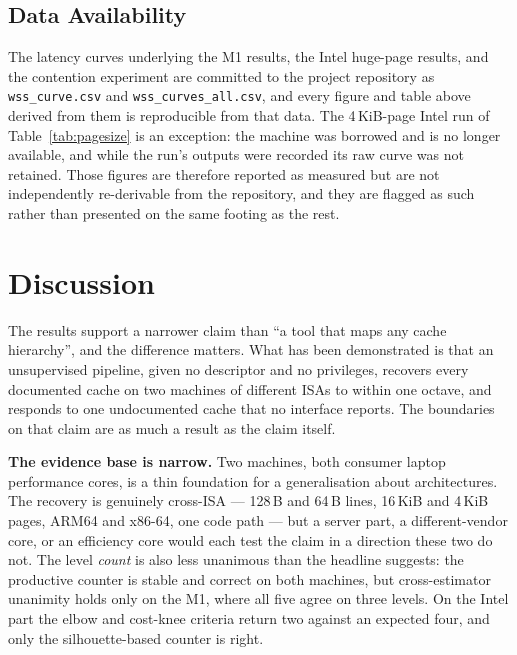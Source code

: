 \documentclass[conference]{IEEEtran}
\begin{document}
\subsection{Data Availability}

The latency curves underlying the M1 results, the Intel huge-page results, and
the contention experiment are committed to the project repository as
\texttt{wss\_curve.csv} and \texttt{wss\_curves\_all.csv}, and every figure and
table above derived from them is reproducible from that data. The 4\,KiB-page
Intel run of Table~\ref{tab:pagesize} is an exception: the machine was borrowed
and is no longer available, and while the run's outputs were recorded its raw
curve was not retained. Those figures are therefore reported as measured but are
not independently re-derivable from the repository, and they are flagged as such
rather than presented on the same footing as the rest.

\section{Discussion}
\label{sec:discussion}

The results support a narrower claim than ``a tool that maps any cache
hierarchy'', and the difference matters. What has been demonstrated is that an
unsupervised pipeline, given no descriptor and no privileges, recovers every
documented cache on two machines of different ISAs to within one octave, and
responds to one undocumented cache that no interface reports. The boundaries on
that claim are as much a result as the claim itself.

\textbf{The evidence base is narrow.} Two machines, both consumer laptop
performance cores, is a thin foundation for a generalisation about architectures.
The recovery is genuinely cross-ISA --- 128\,B and 64\,B lines, 16\,KiB and
4\,KiB pages, ARM64 and x86-64, one code path --- but a server part, a
different-vendor core, or an efficiency core would each test the claim in a
direction these two do not. The level \emph{count} is also less unanimous than the
headline suggests: the productive counter is stable and correct on both machines,
but cross-estimator unanimity holds only on the M1, where all five agree on three
levels. On the Intel part the elbow and cost-knee criteria return two against an
expected four, and only the silhouette-based counter is right.
\end{document}
